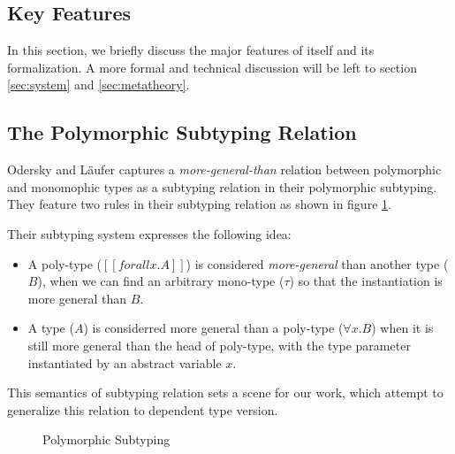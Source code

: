 \subsection{Key Features}

In this section, we briefly discuss the major features of \name itself and
its formalization. A more formal and technical discussion will be left to
section \ref{sec:system} and \ref{sec:metatheory}.

\subsection{The Polymorphic Subtyping Relation}
Odersky and L\"aufer captures a \emph{more-general-than} relation between
polymorphic and monomophic types as a subtyping relation in their polymorphic
subtyping\cite{odersky1996putting}. They feature two rules in their
subtyping relation as shown in figure \ref{fig:polymorphic-subtyping}.

Their subtyping system expresses the following idea:

\begin{itemize}
  \item A poly-type ($[[forall x. A]]$) is considered \emph{more-general}
        than another type ($B$), when we can find an arbitrary mono-type ($\tau$)
        so that the instantiation is more general than $B$.
  \item A type ($A$) is considerred more general than a poly-type ($\forall x. B$)
        when it is still more general than the head of poly-type, with the type
        parameter instantiated by an abstract variable $x$.
\end{itemize}

This semantics of subtyping relation sets a scene for our work, which attempt
to generalize this relation to dependent type version.

\begin{figure}
\label{fig:polymorphic-subtyping}
\centering


\caption{Polymorphic Subtyping}
\end{figure}


